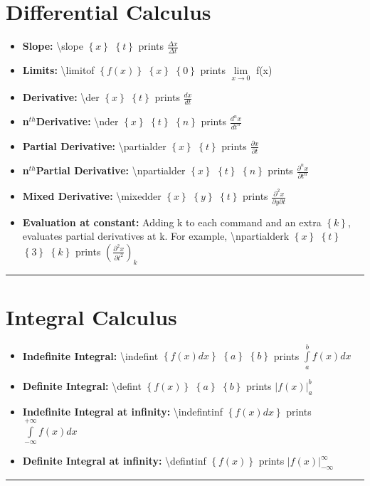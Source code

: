 \documentclass[12pt]{article}
\newcommand{\esc}{\textbackslash}
\newcommand{\braces}[1]{\ensuremath{\left\lbrace #1 \right\rbrace}}
\newcommand{\bigbrac}[1]{\ensuremath{\left( #1 \right)}}
\newcommand{\nth}{\ensuremath{^{th}}}
\newcommand{\slope}[2]{\ensuremath{\displaystyle\frac{\Delta #1}{\Delta #2}}}
\newcommand{\limitof}[3]{\ensuremath{\lim\limits_{#2 \rightarrow #3}} #1}
\newcommand{\der}[2]{\ensuremath{\displaystyle\frac{d #1}{d #2}}}
\newcommand{\nder}[3]{\ensuremath{\displaystyle\frac{d^{#3} #1}{d #2^{#3}}}}
\newcommand{\partialder}[2]{\ensuremath{\displaystyle\frac{\partial #1}{\partial #2}}}
\newcommand{\mixedder}[3]{\ensuremath{\displaystyle\frac{\partial^2 #1}{\partial #2 \partial #3}}}
\newcommand{\npartialder}[3]{\ensuremath{\displaystyle\frac{\partial^{#3} #1}{\partial #2^{#3}}}}
\newcommand{\npartialderk}[4]{\ensuremath{\bigbrac{\displaystyle\frac{\partial^{#3} #1}{\partial #2^{#3}}}_{#4}}}
\newcommand{\indefint}[3]{\ensuremath{\int\limits_{#2}^{#3} #1}}
\newcommand{\defint}[3]{\ensuremath{\left|#1\right|_{#2}^{#3}}}
\newcommand{\indefintinf}[1]{\ensuremath{\int\limits_{-\infty}^{+\infty} #1}}
\newcommand{\defintinf}[1]{\ensuremath{\left|#1\right|_{-\infty}^{\infty}}}
\newcommand{\drawline}{\vspace{5mm}\hrule}
\newcommand{\nextpage}{\vspace{5mm}\hrule\newpage}
\newcommand{\point}[1]{\item\textbf{#1:}}
\begin{document}
\section{Differential Calculus}

\begin{itemize}

\point{Slope} \esc slope \braces{x} \braces{t} prints \slope{x}{t}

\point{Limits} \esc limitof \braces{f(x)} \braces{x} \braces{0} prints \limitof{f(x)}{x}{0}

\point{Derivative} \esc der \braces{x} \braces{t} prints \der{x}{t}

\point{n\nth Derivative} \esc nder \braces{x} \braces{t} \braces{n} prints \nder{x}{t}{n}

\point{Partial Derivative} \esc partialder \braces{x} \braces{t} prints \partialder{x}{t}

\point{n\nth Partial Derivative} \esc npartialder \braces{x} \braces{t} \braces{n} prints \npartialder{x}{t}{n}

\point{Mixed Derivative} \esc mixedder \braces{x} \braces{y} \braces{t} prints \mixedder{x}{y}{t}

\point{Evaluation at constant} Adding k to each command and an extra \braces{k}, evaluates partial derivatives at k. For example, \esc npartialderk \braces{x} \braces{t} \braces{3} \braces{k} prints \npartialderk{x}{t}{2}{k}

\end{itemize}
\drawline

\section{Integral Calculus}

\begin{itemize}

\point{Indefinite Integral} \esc indefint \braces{f(x) dx} \braces{a} \braces{b} prints \indefint{f(x) dx}{a}{b}

\point{Definite Integral} \esc defint \braces{f(x)} \braces{a} \braces{b} prints \defint{f(x)}{a}{b}

\point{Indefinite Integral at infinity} \esc indefintinf \braces{f(x) dx} prints \indefintinf{f(x) dx}

\point{Definite Integral at infinity} \esc defintinf \braces{f(x)} prints \defintinf{f(x)}

\end{itemize}
\nextpage
\end{document}
